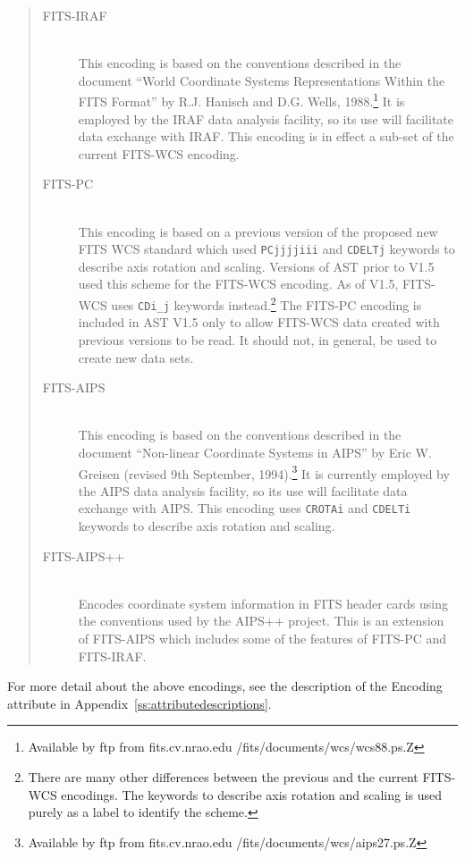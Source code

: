 \documentclass[twoside,11pt]{article}
\newcommand{\appref}[1]{Appendix~\ref{#1}}
\newcommand{\appref}[1]{\ref{#1}}
\begin{document}
\begin{quote}
\begin{description}
\item[FITS-IRAF]\mbox{}\\
This encoding is based on the conventions described in the document
``World Coordinate Systems Representations Within the FITS Format'' by R.J.
Hanisch and D.G. Wells, 1988.\footnote{Available by ftp from
fits.cv.nrao.edu /fits/documents/wcs/wcs88.ps.Z} It is employed
by the IRAF data analysis facility, so its use will facilitate data
exchange with IRAF. This encoding is in effect a sub-set of the current
FITS-WCS encoding.

\item[FITS-PC]\mbox{}\\
This encoding is based on a previous version of the proposed new FITS WCS
standard which used {\tt PCjjjjiii} and {\tt CDELTj} keywords to describe
axis rotation and scaling. Versions of AST prior to V1.5 used this scheme
for the FITS-WCS encoding. As of V1.5, FITS-WCS uses {\tt CDi\_j}
keywords instead.\footnote{There are many other differences between the
previous and the current FITS-WCS encodings. The keywords to describe
axis rotation and scaling is used purely as a label to identify the
scheme.} The FITS-PC encoding is included in AST V1.5 only to allow
FITS-WCS data created with previous versions to be read. It should not,
in general, be used to create new data sets.

\item[FITS-AIPS]\mbox{}\\
This encoding is based on the conventions described in the document
``Non-linear Coordinate Systems in AIPS'' by Eric W. Greisen (revised 9th
September, 1994).\footnote{Available by ftp from fits.cv.nrao.edu
/fits/documents/wcs/aips27.ps.Z} It is currently employed by the AIPS
data analysis facility, so its use will facilitate data exchange with
AIPS. This encoding uses {\tt CROTAi} and {\tt CDELTi} keywords to
describe axis rotation and scaling.

\item[FITS-AIPS++]\mbox{}\\
Encodes coordinate system information in FITS
header cards using the conventions used by the AIPS++ project.
This is an extension of FITS-AIPS which includes some of the
features of FITS-PC and FITS-IRAF.
\end{description}
\end{quote}

For more detail about the above encodings, see the description of the
Encoding attribute in \appref{ss:attributedescriptions}.
\end{document}
